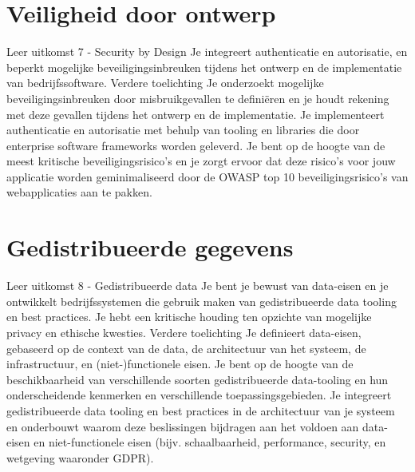 \section{Veiligheid door ontwerp}\label{sec:veiligheid-door-ontwerp}
Leer uitkomst 7 - Security by Design Je integreert authenticatie en autorisatie, en beperkt mogelijke beveiligingsinbreuken tijdens het ontwerp en de implementatie van bedrijfssoftware.
Verdere toelichting Je onderzoekt mogelijke beveiligingsinbreuken door misbruikgevallen te definiëren en je houdt rekening met deze gevallen tijdens het ontwerp en de implementatie.
Je implementeert authenticatie en autorisatie met behulp van tooling en libraries die door enterprise software frameworks worden geleverd.
Je bent op de hoogte van de meest kritische beveiligingsrisico's en je zorgt ervoor dat deze risico's voor jouw
applicatie worden geminimaliseerd door de OWASP top 10 beveiligingsrisico's van webapplicaties aan te pakken.







\section{Gedistribueerde gegevens}\label{sec:gedistribueerde-gegevens}
Leer uitkomst 8 - Gedistribueerde data Je bent je bewust van data-eisen en je ontwikkelt bedrijfssystemen die gebruik maken van gedistribueerde data tooling en best practices.
Je hebt een kritische houding ten opzichte van mogelijke privacy en ethische kwesties.
Verdere toelichting Je definieert data-eisen, gebaseerd op de context van de data, de architectuur van het systeem, de infrastructuur, en (niet-)functionele eisen.
Je bent op de hoogte van de beschikbaarheid van verschillende soorten gedistribueerde data-tooling en hun onderscheidende kenmerken en verschillende toepassingsgebieden.
Je integreert gedistribueerde data tooling en best practices in de architectuur van je systeem en onderbouwt waarom deze beslissingen bijdragen aan het voldoen aan data-eisen en niet-functionele eisen (bijv.
schaalbaarheid, performance, security, en wetgeving waaronder GDPR).
